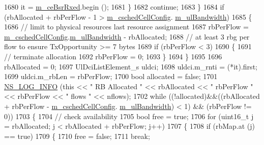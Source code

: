 \begin{DoxyCode}
1680               it = \hyperlink{classns3_1_1TdTbfqFfMacScheduler_ab399ba0c15f9cd1688fb044cf915deb7}{m\_ceBsrRxed}.begin ();
1681             \}
1682           \textcolor{keywordflow}{continue};
1683         \}
1684       \textcolor{keywordflow}{if} (rbAllocated + rbPerFlow - 1 > \hyperlink{classns3_1_1TdTbfqFfMacScheduler_a3ac3e4b1b3818ff204d6ff6c89c19f4d}{m\_cschedCellConfig}.
      \hyperlink{structns3_1_1FfMacCschedSapProvider_1_1CschedCellConfigReqParameters_a5ab5b102878e6e7e7727a14af4a64d2f}{m\_ulBandwidth})
1685         \{
1686           \textcolor{comment}{// limit to physical resources last resource assignment}
1687           rbPerFlow = \hyperlink{classns3_1_1TdTbfqFfMacScheduler_a3ac3e4b1b3818ff204d6ff6c89c19f4d}{m\_cschedCellConfig}.\hyperlink{structns3_1_1FfMacCschedSapProvider_1_1CschedCellConfigReqParameters_a5ab5b102878e6e7e7727a14af4a64d2f}{m\_ulBandwidth} - rbAllocated;
1688           \textcolor{comment}{// at least 3 rbg per flow to ensure TxOpportunity >= 7 bytes}
1689           \textcolor{keywordflow}{if} (rbPerFlow < 3)
1690             \{
1691               \textcolor{comment}{// terminate allocation}
1692               rbPerFlow = 0;      
1693             \}
1694         \}
1695 
1696       rbAllocated = 0;
1697       UlDciListElement\_s uldci;
1698       uldci.m\_rnti = (*it).first;
1699       uldci.m\_rbLen = rbPerFlow;
1700       \textcolor{keywordtype}{bool} allocated = \textcolor{keyword}{false};
1701       \hyperlink{group__logging_gafbd73ee2cf9f26b319f49086d8e860fb}{NS\_LOG\_INFO} (\textcolor{keyword}{this} << \textcolor{stringliteral}{" RB Allocated "} << rbAllocated << \textcolor{stringliteral}{" rbPerFlow "} << rbPerFlow << \textcolor{stringliteral}{"
       flows "} << nflows);
1702       \textcolor{keywordflow}{while} ((!allocated)&&((rbAllocated + rbPerFlow - \hyperlink{classns3_1_1TdTbfqFfMacScheduler_a3ac3e4b1b3818ff204d6ff6c89c19f4d}{m\_cschedCellConfig}.
      \hyperlink{structns3_1_1FfMacCschedSapProvider_1_1CschedCellConfigReqParameters_a5ab5b102878e6e7e7727a14af4a64d2f}{m\_ulBandwidth}) < 1) && (rbPerFlow != 0))
1703         \{
1704           \textcolor{comment}{// check availability}
1705           \textcolor{keywordtype}{bool} free = \textcolor{keyword}{true};
1706           \textcolor{keywordflow}{for} (uint16\_t j = rbAllocated; j < rbAllocated + rbPerFlow; j++)
1707             \{
1708               \textcolor{keywordflow}{if} (rbMap.at (j) == \textcolor{keyword}{true})
1709                 \{
1710                   free = \textcolor{keyword}{false};
1711                   \textcolor{keywordflow}{break};

\end{DoxyCode}
